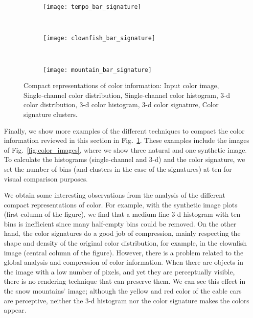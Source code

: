 \begin{figure}[!ht]
    \begin{subfigure}[t]{\textwidth+20pt\relax}
    	\makebox[20pt]{\raisebox{0pt}{}}%
    	\texttt{[image: tempo\_bar\_signature]}
    \end{subfigure}~ 
    \begin{subfigure}[b]{0.32\textwidth}
        \texttt{[image: clownfish\_bar\_signature]}
    \end{subfigure}~
    \begin{subfigure}[b]{0.32\textwidth}
        \texttt{[image: mountain\_bar\_signature]}
    \end{subfigure}
                    
	\caption{Compact representations of color information:  Input color image,  Single-channel color distribution,  Single-channel color histogram,  3-d color distribution,  3-d color histogram,  3-d color signature,  Color signature clusters.}\label{fig:color_image_representations}    
\end{figure}

Finally, we show more examples of the different techniques to compact the color information reviewed in this section in Fig.\ \ref{fig:color_image_representations}. These examples include the images of Fig.\ \ref{fig:color_images}, where we show three natural and one synthetic image. To calculate the histograms (single-channel and 3-d) and the color signature, we set the number of bins (and clusters in the case of the signatures) at ten for visual comparison purposes.

We obtain some interesting observations from the analysis of the different compact representations of color. For example, with the synthetic image plots (first column of the figure), we find that a medium-fine 3-d histogram with ten bins is inefficient since many half-empty bins could be removed. On the other hand, the color signatures do a good job of compression, mainly respecting the shape and density of the original color distribution, for example, in the clownfish image (central column of the figure). However, there is a problem related to the global analysis and compression of color information. When there are objects in the image with a low number of pixels, and yet they are perceptually visible, there is no rendering technique that can preserve them. We can see this effect in the snow mountains' image; although the yellow and red color of the cable cars are perceptive, neither the 3-d histogram nor the color signature makes the colors appear.

